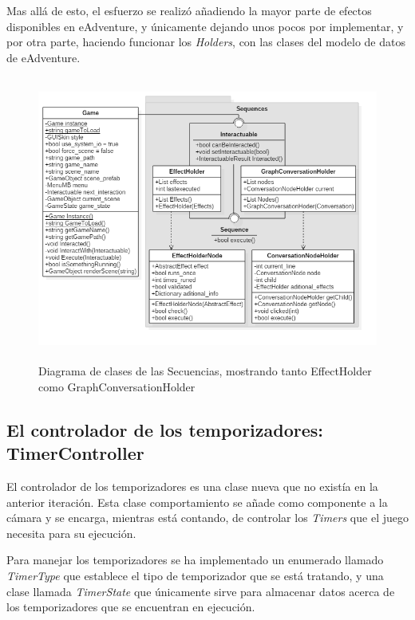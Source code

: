 Mas allá de esto, el esfuerzo se realizó añadiendo la mayor parte de efectos disponibles en eAdventure, y únicamente dejando unos pocos por implementar, y por otra parte, haciendo funcionar los \textit{Holders}, con las clases del modelo de datos de eAdventure.

\begin{figure}[h!]
	\centerline{\includegraphics[height=3.7in]{figures/it2/Sequences.png}}
	\caption[Sequences - Versión Final]{Diagrama de clases de las Secuencias, mostrando tanto EffectHolder como GraphConversationHolder}
	\label{sequencesfigit2}
\end{figure}

\subsection{El controlador de los temporizadores: TimerController}

El controlador de los temporizadores es una clase nueva que no existía en la anterior iteración. Esta clase comportamiento se añade como componente a la cámara y se encarga, mientras está contando, de controlar los \textit{Timers} que el juego necesita para su ejecución.

Para manejar los temporizadores se ha implementado un enumerado llamado \textit{TimerType} que establece el tipo de temporizador que se está tratando, y una clase llamada \textit{TimerState} que únicamente sirve para almacenar datos acerca de los temporizadores que se encuentran en ejecución.

